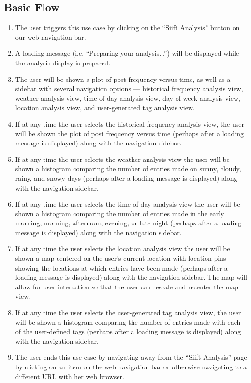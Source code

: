 \documentclass[a4paper]{article}
\begin{document}
	\subsection{Basic Flow}
    \begin{enumerate}
    	\item The user triggers this use case by clicking on the ``Siift Analysis'' button on our web navigation bar.
        \item A loading message (i.e. ``Preparing your analysis...'') will be displayed while the analysis display is prepared.
        \item The user will be shown a plot of post frequency versus time, as well as a sidebar with several navigation options --- historical frequency analysis view, weather analysis view, time of day analysis view, day of week analysis view, location analysis view, and user-generated tag analysis view.
        \item If at any time the user selects the historical frequency analysis view, the user will be shown the plot of post frequency versus time (perhaps after a loading message is displayed) along with the navigation sidebar.
        \item If at any time the user selects the weather analysis view the user will be shown a histogram comparing the number of entries made on sunny, cloudy, rainy, and snowy days (perhaps after a loading message is displayed) along with the navigation sidebar.
        \item If at any time the user selects the time of day analysis view the user will be shown a histogram comparing the number of entries made in the early morning, morning, afternoon, evening, or late night (perhaps after a loading message is displayed) along with the navigation sidebar.
        \item If at any time the user selects the location analysis view the user will be shown a map centered on the user's current location with location pins showing the locations at which entries have been made (perhaps after a loading message is displayed) along with the navigation sidebar. The map will allow for user interaction so that the user can rescale and recenter the map view.
        \item If at any time the user selects the user-generated tag analysis view, the user will be shown a histogram comparing the number of entries made with each of the user-defined tags (perhaps after a loading message is displayed) along with the navigation sidebar.
        \item The user ends this use case by navigating away from the ``Siift Analysis'' page by clicking on an item on the web navigation bar or otherwise navigating to a different URL with her web browser.
    \end{enumerate}
\end{document}
